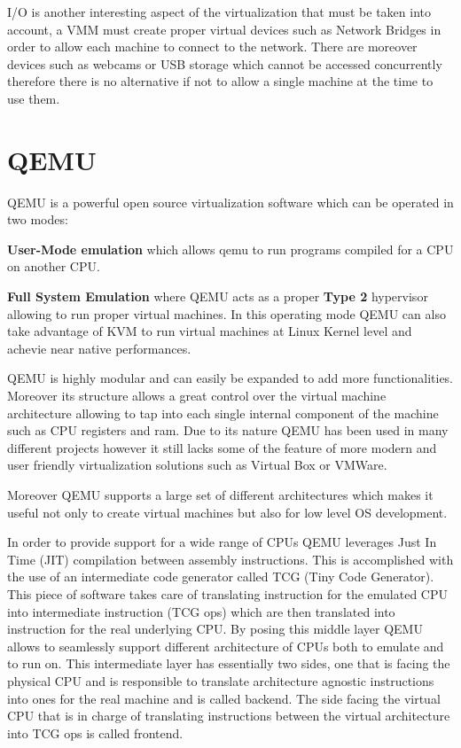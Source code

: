 I/O is another interesting aspect of the virtualization that must be taken into account, a VMM must create proper virtual devices such as Network Bridges in order to allow each machine to connect to the network. There are moreover devices such as webcams or USB storage which cannot be accessed concurrently therefore there is no alternative if not to allow a single machine at the time to use them.

\section{QEMU}


QEMU is a powerful open source virtualization software which can be operated in two modes: 

\textbf{User-Mode emulation} which allows qemu to run programs compiled for a CPU on another CPU.

\textbf{Full System Emulation} where QEMU acts as a proper \textbf{Type 2} hypervisor allowing to run proper virtual machines. In this operating mode QEMU can also take advantage of KVM to run virtual machines at Linux Kernel level and achevie near native performances. 

QEMU is highly modular and can easily be expanded to add more functionalities. Moreover its structure allows a great control over the virtual machine architecture allowing to tap into each single internal component of the machine such as CPU registers and ram. Due to its nature QEMU has been used in many different projects however it still lacks some of the feature of more modern and user friendly virtualization solutions such as Virtual Box or VMWare.

Moreover QEMU supports a large set of different architectures which makes it useful not only to create virtual machines but also for low level OS development.

In order to provide support for a wide range of CPUs QEMU leverages Just In Time (JIT) compilation between assembly instructions. This is accomplished with the use of an intermediate code generator called TCG (Tiny Code Generator). This piece of software takes care of translating instruction for the emulated CPU into intermediate instruction (TCG ops) which are then translated into instruction for the real underlying CPU. By posing this middle layer QEMU allows to seamlessly support different architecture of CPUs both to emulate and to run on. This intermediate layer has essentially two sides, one that is facing the physical CPU and is responsible to translate architecture agnostic instructions into ones for the real machine and is called backend. The side facing the virtual CPU that is in charge of translating instructions between the virtual architecture into TCG ops is called frontend.

